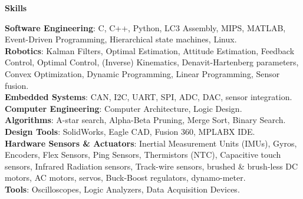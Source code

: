 \documentclass[paper=a4,fontsize=11pt]{article} %
\def \subSectionSpace   {0.3cm}     %
\def \leftColSpace      {0.12}      %
\def \bigMiddleColSpace {0.875}     %
\def \lineWidth         {18cm}      %
\def \lineThickness     {2pt}       %
\begin{document}
    \noindent
    \begin{minipage}[t]{\leftColSpace\linewidth}
    \noindent \textbf{Skills}\\
    \end{minipage}
    \begin{minipage}[t]{\bigMiddleColSpace\linewidth}
        \begin{flushleft}
            \noindent \textbf{Software Engineering}: C, C++, Python, LC3 Assembly, MIPS, MATLAB, Event-Driven Programming, Hierarchical state machines, Linux.\\
            \vspace{\subSectionSpace}
            \noindent \textbf{Robotics}: Kalman Filters, Optimal Estimation, Attitude Estimation, Feedback Control, Optimal Control, (Inverse) Kinematics, Denavit-Hartenberg parameters, Convex Optimization, Dynamic Programming, Linear Programming, Sensor fusion.\\
            \vspace{\subSectionSpace}
            \noindent \textbf{Embedded Systems}: CAN, I2C, UART, SPI, ADC, DAC, sensor integration.\\
            \vspace{\subSectionSpace}
            \noindent \textbf{Computer Engineering}: Computer Architecture, Logic Design.\\
            \vspace{\subSectionSpace}
            \noindent \textbf{Algorithms}: A-star search, Alpha-Beta Pruning, Merge Sort, Binary Search.\\
            \vspace{\subSectionSpace}
            \noindent \textbf{Design Tools}: SolidWorks, Eagle CAD, Fusion 360, MPLABX IDE.\\
            \vspace{\subSectionSpace}
            \noindent \textbf{Hardware Sensors \& Actuators}: Inertial Measurement Units (IMUs), Gyros, Encoders, Flex Sensors, Ping Sensors, Thermistors (NTC), Capacitive touch sensors, Infrared Radiation sensors, Track-wire sensors, brushed \& brush-less DC motors, AC motors, servos, Buck-Boost regulators, dynamo-meter.\\
            \vspace{\subSectionSpace}
            \noindent \textbf{Tools}: Oscilloscopes, Logic Analyzers, Data Acquisition Devices.\\
        \end{flushleft}
    \end{minipage}
\end{document}
